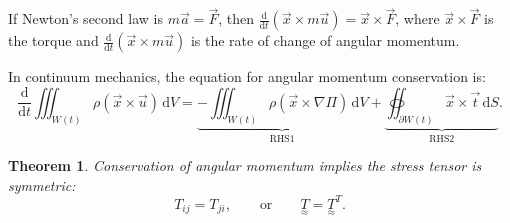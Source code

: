 \documentclass[11pt,a4paper]{article}
\newtheorem{theorem}{Theorem}[section]
\newcommand{\xv}{\vec{x}}
\newcommand{\uv}{\vec{u}}
\newcommand{\tv}{\vec{t}}
\newcommand{\Fv}{\vec{F}}
\newcommand{\tens}[1]{\underset{\approx}{#1}}
\begin{document}
If Newton's second law is $m\vec{a} = \Fv$, then $\frac{\mathrm{d}}{\mathrm{d}t}(\xv \times m\uv) = \xv \times \Fv$, where $\xv \times \Fv$ is the torque and $\frac{\mathrm{d}}{\mathrm{d}t}(\xv \times m\uv)$ is the rate of change of angular momentum.

In continuum mechanics, the equation for angular momentum conservation is:
\[
    \frac{\mathrm{d}}{\mathrm{d}t}\iiint_{W(t)} \rho(\xv \times \uv)\,\mathrm{d}V
    = \underbrace{-\iiint_{W(t)} \rho(\xv \times \nabla\Pi)\,\mathrm{d}V}_{\text{RHS1}}
    + \underbrace{\oiint_{\partial W(t)} \xv \times \tv\,\mathrm{d}S}_{\text{RHS2}}.
\]

\begin{theorem}
Conservation of angular momentum implies the stress tensor is symmetric:
\[
    T_{ij} = T_{ji}, \qquad \text{or} \qquad \tens{T} = \tens{T}^T.
\]
\end{theorem}
\end{document}
